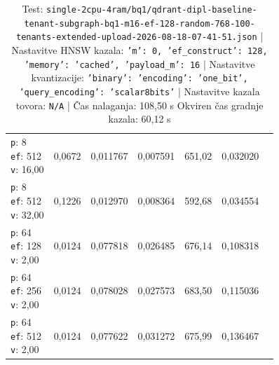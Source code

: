 \begin{table}[htbp]
\begin{tabularx}{\textwidth}{Xrrrrrr}
    \makecell{\texttt{p}: 8\\\texttt{ef}: 512\\\texttt{v}: 16,00} & 0,0672 & 0,011767 & 0,007591 & 651,02 & 0,032020 \\
    \makecell{\texttt{p}: 8\\\texttt{ef}: 512\\\texttt{v}: 32,00} & 0,1226 & 0,012970 & 0,008364 & 592,68 & 0,034554 \\
    \makecell{\texttt{p}: 64\\\texttt{ef}: 128\\\texttt{v}: 2,00} & 0,0124 & 0,077818 & 0,026485 & 676,14 & 0,108318 \\
    \makecell{\texttt{p}: 64\\\texttt{ef}: 256\\\texttt{v}: 2,00} & 0,0124 & 0,078028 & 0,027573 & 683,50 & 0,115036 \\
    \makecell{\texttt{p}: 64\\\texttt{ef}: 512\\\texttt{v}: 2,00} & 0,0124 & 0,077622 & 0,031272 & 675,99 & 0,136467 \\
    \bottomrule
  \end{tabularx}
\caption* {Test: \texttt{single-2cpu-4ram/bq1/qdrant-dipl-baseline-tenant-subgraph-bq1-m16-ef-128-random-768-100-tenants-extended-upload-2026-08-18-07-41-51.json} | Nastavitve HNSW kazala: \texttt{{'m': 0, 'ef\_construct': 128, 'memory': 'cached', 'payload\_m': 16}} | Nastavitve kvantizacije: \texttt{{'binary': {'encoding': 'one\_bit', 'query\_encoding': 'scalar8bits'}}} | Nastavitve kazala tovora: \texttt{N/A} | Čas nalaganja: 108,50 s Okviren čas gradnje kazala: 60,12 s}\end{table}


